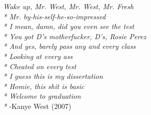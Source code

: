 \textit{Wake up, Mr. West, Mr. West, Mr. Fresh\\*
Mr. by-his-self-he-so-impressed\\*
I mean, damn, did you even see the test\\*
You got D's motherfucker, D's, Rosie Perez\\*
And yes, barely pass any and every class\\*
Looking at every ass\\*
Cheated on every test\\*
I guess this is my dissertation\\*
Homie, this shit is basic\\*
Welcome to graduation\\* }
-Kanye West (2007)